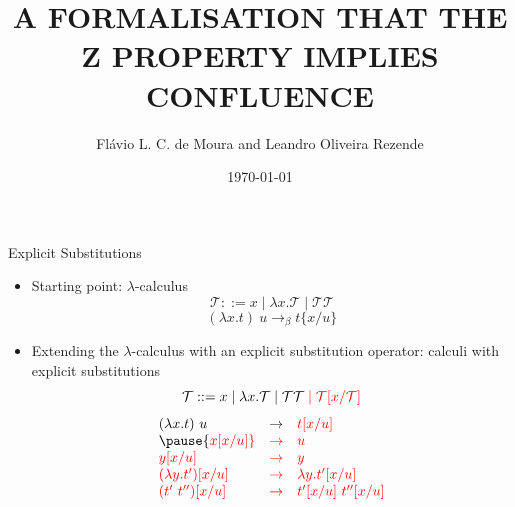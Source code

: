 \documentclass[10pt]{beamer}
\title{A FORMALISATION THAT THE Z PROPERTY IMPLIES CONFLUENCE}
\date{\today}
\author{Flávio L. C. de Moura and Leandro Oliveira Rezende}
\institute{Seminário do GTC/UnB}
\newcommand{\term}{{\mathcal{T}}}
\newcommand{\db}[1]{{\bf \underline{#1}}}
\begin{document}
\maketitle

\begin{frame}[fragile]{Explicit Substitutions}
  \begin{itemize}
  \item Starting point: $\lambda$-calculus
    $$\term ::= x \mid \lambda x.\term \mid \term\term $$
    $$(\lambda x.t)\ u \to_\beta t\{x/u\}$$
    \pause
    \item Extending the $\lambda$-calculus with an explicit substitution operator: {\color{red} calculi with explicit substitutions} 
    $$\term ::= x \mid \lambda x.\term \mid \term\term\; {\color{red} \mid \term[x/\term]}$$ \pause
    $$\begin{array}{lll}
        (\lambda x.t)\ u &  \to &  {\color{red} t[x/u]} \\ \pause
        {\color{red} x[x/u]} & {\color{red}\to} & {\color{red}u} \\
        {\color{red} y[x/u]} & {\color{red}\to} & {\color{red}y} \\
        {\color{red}(\lambda y.t')[x/u]} &  {\color{red} \to} &  {\color{red} \lambda y. t'[x/u]} \\
        {\color{red} (t'\ t'')[x/u]} & {\color{red}\to} & {\color{red} t'[x/u]\ t''[x/u]} \\
      \end{array}$$
  \end{itemize}
\end{frame}

\end{document}
